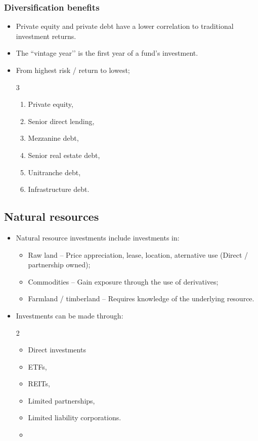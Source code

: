 \documentclass[../notes_compiled.tex]{subfiles}
\begin{document}
\subsubsection{Diversification benefits}
\begin{itemize}
\item Private equity and private debt have a lower correlation to traditional investment returns.
\item The ``vintage year’’ is the first year of a fund’s investment.
\item From highest risk / return to lowest;
\begin{multicols}{3}
\begin{enumerate}
\item[1.] Private equity,
\item[4.] Senior direct lending,
\item[2.] Mezzanine debt,
\item[5.] Senior real estate debt,
\item[3.] Unitranche debt,
\item[6.] Infrastructure debt.
\end{enumerate}
\end{multicols}
\end{itemize}

\subsection{Natural resources}
\begin{itemize}
\item Natural resource investments include investments in:
\begin{itemize}
\item Raw land -- Price appreciation, lease, location, aternative use (Direct / partnership owned);
\item Commodities -- Gain exposure through the use of derivatives;
\item Farmland / timberland -- Requires knowledge of the underlying resource.
\end{itemize}
\item Investments can be made through:
\begin{multicols}{2}
\begin{itemize}
\item Direct investments
\item ETFs,
\item REITs,
\item Limited partnerships,
\item Limited liability corporations.
\item[]
\end{itemize}
\end{multicols}
\end{itemize}
\end{document}
